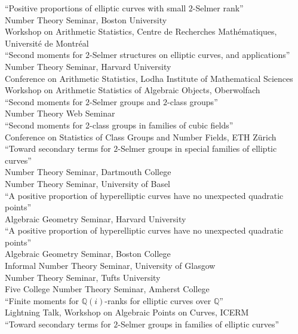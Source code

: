\documentclass[11pt]{article} %
\begin{document}
 ``Positive proportions of elliptic curves with small $2$-Selmer rank''\\
Number Theory Seminar, Boston University \\
Workshop on Arithmetic Statistics, Centre de Recherches Math\'{e}matiques, Universit\'{e} de Montr\'{e}al \\
 ``Second moments for $2$-Selmer structures on elliptic curves, and applications''\\
Number Theory Seminar, Harvard University \\
Conference on Arithmetic Statistics, Lodha Institute of Mathematical Sciences\\
Workshop on Arithmetic Statistics of Algebraic Objects, Oberwolfach \\
 ``Second moments for 
$2$-Selmer groups and 
$2$-class groups''\\
Number Theory Web Seminar\\
 ``Second moments for 2-class groups in families of cubic fields''\\
Conference on Statistics of Class Groups and Number Fields, ETH Z\"{u}rich \\
 ``Toward secondary terms for $2$-Selmer groups in special families of elliptic curves''\\
Number Theory Seminar, Dartmouth College \\
Number Theory Seminar, University of Basel\\
 ``A positive proportion of hyperelliptic curves have no unexpected quadratic points'' \\
Algebraic Geometry Seminar, Harvard University\\
 ``A positive proportion of hyperelliptic curves have no unexpected quadratic points'' \\
Algebraic Geometry Seminar, Boston College \\
Informal Number Theory Seminar, University of Glasgow \\
Number Theory Seminar, Tufts University \\
Five College Number Theory Seminar, Amherst College \\
 ``Finite moments for $\mathbb{Q}(i)$-ranks for elliptic curves over $\mathbb{Q}$'' \\
Lightning Talk, Workshop on Algebraic Points on Curves, ICERM \\
 ``Toward secondary terms for $2$-Selmer groups in families of elliptic curves'' \\
\end{document}

